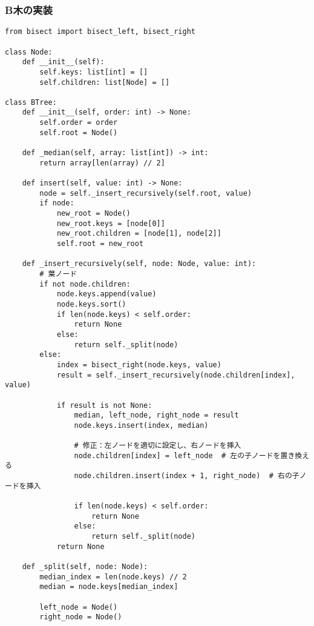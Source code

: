 \subsubsection{B木の実装}

\begin{lstlisting}[caption=B木の実装, label=btree, frame=TRBL, label={btree}]
from bisect import bisect_left, bisect_right

class Node:
    def __init__(self):
        self.keys: list[int] = []
        self.children: list[Node] = []

class BTree:
    def __init__(self, order: int) -> None:
        self.order = order
        self.root = Node()
    
    def _median(self, array: list[int]) -> int:
        return array[len(array) // 2]

    def insert(self, value: int) -> None:
        node = self._insert_recursively(self.root, value)
        if node:
            new_root = Node()
            new_root.keys = [node[0]]
            new_root.children = [node[1], node[2]]
            self.root = new_root
    
    def _insert_recursively(self, node: Node, value: int):
        # 葉ノード
        if not node.children:
            node.keys.append(value)
            node.keys.sort()
            if len(node.keys) < self.order:
                return None 
            else:
                return self._split(node)
        else:  
            index = bisect_right(node.keys, value)
            result = self._insert_recursively(node.children[index], value)
            
            if result is not None:
                median, left_node, right_node = result
                node.keys.insert(index, median)
                
                # 修正：左ノードを適切に設定し、右ノードを挿入
                node.children[index] = left_node  # 左の子ノードを置き換える
                node.children.insert(index + 1, right_node)  # 右の子ノードを挿入

                if len(node.keys) < self.order:
                    return None
                else:
                    return self._split(node) 
            return None

    def _split(self, node: Node):
        median_index = len(node.keys) // 2
        median = node.keys[median_index]

        left_node = Node()
        right_node = Node()


\end{lstlisting}
